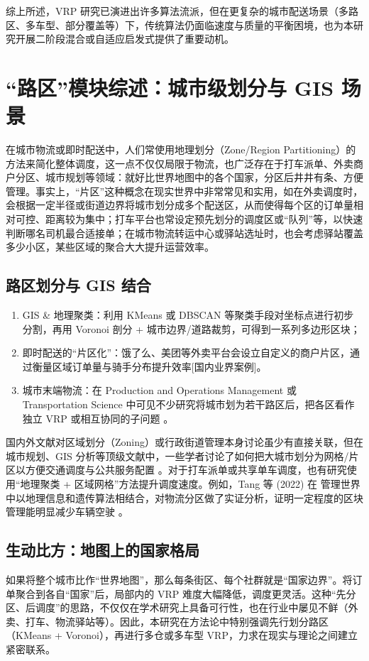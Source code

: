 \documentclass[12pt,a4paper,twoside]{ctexbook}
\begin{document}
综上所述，VRP 研究已演进出许多算法流派，但在更复杂的城市配送场景（多路区、多车型、部分覆盖等）下，传统算法仍面临速度与质量的平衡困境，也为本研究开展二阶段混合或自适应启发式提供了重要动机。

\section{“路区”模块综述：城市级划分与 GIS 场景}
在城市物流或即时配送中，人们常使用地理划分（Zone/Region Partitioning）的方法来简化整体调度，这一点不仅仅局限于物流，也广泛存在于打车派单、外卖商户分区、城市规划等领域：就好比世界地图中的各个国家，分区后井井有条、方便管理。事实上，“片区”这种概念在现实世界中非常常见和实用，如在外卖调度时，会根据一定半径或街道边界将城市划分成多个配送区，从而使得每个区的订单量相对可控、距离较为集中；打车平台也常设定预先划分的调度区或“队列”等，以快速判断哪名司机最合适接单；在城市物流转运中心或驿站选址时，也会考虑驿站覆盖多少小区，某些区域的聚合大大提升运营效率。

\subsection{路区划分与 GIS 结合}
\begin{enumerate}
    \item GIS \& 地理聚类：利用 KMeans 或 DBSCAN 等聚类手段对坐标点进行初步分割，再用 Voronoi 剖分 + 城市边界/道路裁剪，可得到一系列多边形区块；
    \item 即时配送的“片区化”：饿了么、美团等外卖平台会设立自定义的商户片区，通过衡量区域订单量与骑手分布提升效率[国内业界案例]。
    \item 城市末端物流：在 Production and Operations Management 或 Transportation Science 中可见不少研究将城市划为若干路区后，把各区看作独立 VRP 或相互协同的子问题 \cite{7,10}。
\end{enumerate}

国内外文献对区域划分（Zoning）或行政街道管理本身讨论虽少有直接关联，但在城市规划、GIS 分析等顶级文献中，一些学者讨论了如何把大城市划分为网格/片区以方便交通调度与公共服务配置 \cite{11,12}。对于打车派单或共享单车调度，也有研究使用“地理聚类 + 区域网格”方法提升调度速度。例如，Tang 等 (2022) 在 管理世界 中以地理信息和遗传算法相结合，对物流分区做了实证分析，证明一定程度的区块管理能明显减少车辆空驶 \cite{13}。

\subsection{生动比方：地图上的国家格局}
如果将整个城市比作“世界地图”，那么每条街区、每个社群就是“国家边界”。将订单聚合到各自“国家”后，局部内的 VRP 难度大幅降低，调度更灵活。这种“先分区、后调度”的思路，不仅仅在学术研究上具备可行性，也在行业中屡见不鲜（外卖、打车、物流驿站等）。因此，本研究在方法论中特别强调先行划分路区（KMeans + Voronoi），再进行多仓或多车型 VRP，力求在现实与理论之间建立紧密联系。
\end{document}
